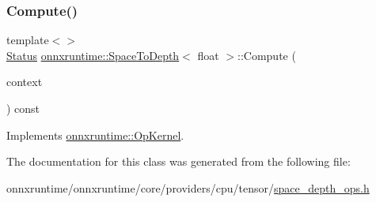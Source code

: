 \mbox{\label{classonnxruntime_1_1SpaceToDepth_a13ddb45806a77589bd81bc8618c9a314}} 
\subsubsection{\texorpdfstring{Compute()}{Compute()}\hspace{0.1cm}{\footnotesize\ttfamily [2/2]}}
{\footnotesize\ttfamily template$<$$>$ \\
\mbox{\hyperlink{classonnxruntime_1_1common_1_1Status}{Status}} \mbox{\hyperlink{classonnxruntime_1_1SpaceToDepth}{onnxruntime\+::\+Space\+To\+Depth}}$<$ float $>$\+::Compute (\begin{DoxyParamCaption}\item[{\mbox{\hyperlink{classonnxruntime_1_1OpKernelContext}{Op\+Kernel\+Context}} $\ast$}]{context }\end{DoxyParamCaption}) const\hspace{0.3cm}{\ttfamily [virtual]}}



Implements \mbox{\hyperlink{classonnxruntime_1_1OpKernel_a9eca8656a78b1b3ab9d3351a12798650}{onnxruntime\+::\+Op\+Kernel}}.



The documentation for this class was generated from the following file\+:\begin{DoxyCompactItemize}
\item 
onnxruntime/onnxruntime/core/providers/cpu/tensor/\mbox{\hyperlink{space__depth__ops_8h}{space\+\_\+depth\+\_\+ops.\+h}}\end{DoxyCompactItemize}
